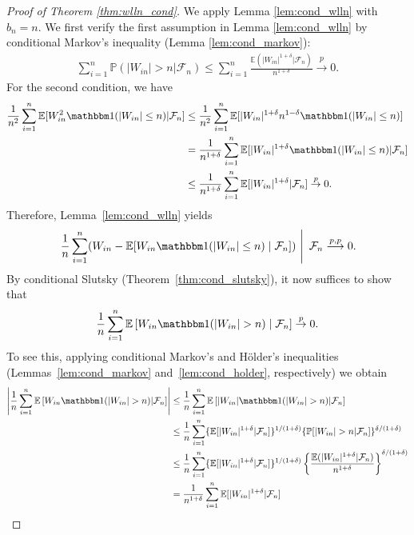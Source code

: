 \documentclass[aos]{imsart}
\theoremstyle{definition}
\theoremstyle{remark}
\newcommand{\E}{\mathbb E}								%
\renewcommand{\P}{\mathbb{P}}							%
\newcommand{\indicator}{\mathbbm 1}						%
\newcommand{\convp}{\overset p \rightarrow}             %
\newcommand{\convpp}{\overset {p,p} \longrightarrow}    %
\begin{document}
	
	\begin{proof}[Proof of Theorem \ref{thm:wlln_cond}] 
		We apply Lemma \ref{lem:cond_wlln} with $b_n=n$. We first verify the first assumption in Lemma \ref{lem:cond_wlln} by conditional Markov's inequality (Lemma \ref{lem:cond_markov}):
		\begin{align*}
			\sum_{i=1}^n\P(|W_{in}|>n|\mathcal{F}_n)\leq \sum_{i=1}^n\frac{\E(|W_{in}|^{1+\delta}|\mathcal{F}_n)}{n^{1+\delta}}\convp0.
		\end{align*}
		For the second condition, we have
		\begin{align*}
			\frac{1}{n^{2}}\sum_{i=1}^n\E[W_{in}^2\indicator(|W_{in}|\leq n)|\mathcal{F}_n]
			&
			\leq \frac{1}{n^2}\sum_{i=1}^n\E[|W_{in}|^{1+\delta}n^{1-\delta}\indicator(|W_{in}|\leq n)]\\
			&
			= \frac{1}{n^{1+\delta}}\sum_{i=1}^n\E[|W_{in}|^{1+\delta}\indicator(|W_{in}|\leq n)|\mathcal{F}_n]\\
			&
			\leq \frac{1}{n^{1+\delta}}\sum_{i=1}^n\E[|W_{in}|^{1+\delta}|\mathcal{F}_n]\convp0.
		\end{align*}
		Therefore, Lemma~\ref{lem:cond_wlln} yields
		\begin{align*}
			\left.\frac1n\sum_{i=1}^n (W_{in}-\E[W_{in}\indicator(|W_{in}|\leq n) \mid \mathcal{F}_n]) \ \right|\ \mathcal{F}_n \convpp 0.
		\end{align*}
		By conditional Slutsky (Theorem~\ref{thm:cond_slutsky}), it now suffices to show that
		\begin{align*}
			\frac{1}{n}\sum_{i=1}^n\E\left[W_{in}\indicator(|W_{in}| > n) \mid \mathcal{F}_n\right] \convp 0.
		\end{align*}
		To see this, applying conditional Markov's and H\"older's inequalities (Lemmas~\ref{lem:cond_markov} and~\ref{lem:cond_holder}, respectively) we obtain
		\begin{align*}
			\left|\frac{1}{n}\sum_{i=1}^n\E\left[W_{in}\indicator(|W_{in}| > n)|\mathcal{F}_n\right]\right|
			&
			\leq \frac{1}{n}\sum_{i=1}^n\E\left[|W_{in}|\indicator(|W_{in}| > n)|\mathcal{F}_n\right]\\
			&
			\leq\frac{1}{n}\sum_{i=1}^n\{\E[|W_{in}|^{1+\delta}|\mathcal{F}_n]\}^{1/(1+\delta)}\{\P[|W_{in}|>n|\mathcal{F}_n]\}^{\delta/(1+\delta)} \\
			&
			\leq \frac{1}{n}\sum_{i=1}^n\{\E[|W_{in}|^{1+\delta}|\mathcal{F}_n]\}^{1/(1+\delta)}\left\{\frac{\E(|W_{in}|^{1+\delta}|\mathcal{F}_n)}{n^{1+\delta}}\right\}^{\delta/(1+\delta)}\\
			&
			=\frac{1}{{n^{1+\delta}}}\sum_{i=1}^n\E[|W_{in}|^{1+\delta}|\mathcal{F}_n]\\

\end{align*}
\end{proof}
\end{document}
